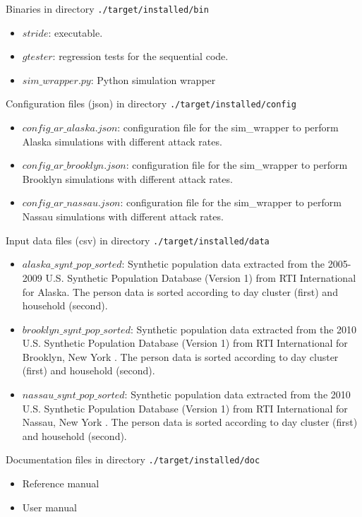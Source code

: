 \begin{compactitem}
    \item Binaries 
    		in directory \texttt{./target/installed/bin}
      	\begin{itemize}
        		\item $stride$: executable.
			\item $gtester$: regression tests for the sequential code.
        		\item $sim\_wrapper.py$: Python simulation wrapper  		
        \end{itemize}
    \item Configuration files (json)
      	in directory \texttt{./target/installed/config}
      	\begin{itemize}
        		\item $config\_ar\_alaska.json$: configuration file for the sim\_wrapper to perform Alaska simulations with different attack rates.
			\item $config\_ar\_brooklyn.json$: configuration file for the sim\_wrapper to perform Brooklyn simulations with different attack rates.
        		\item $config\_ar\_nassau.json$: configuration file for the sim\_wrapper to perform Nassau simulations with different attack rates.
        \end{itemize}
    \item Input data files (csv)
      	in directory \texttt{./target/installed/data}
      	\begin{itemize}
        		\item $alaska\_synt\_pop\_sorted$: Synthetic population data extracted from the 2005-2009 U.S. Synthetic Population Database (Version 1) from RTI International for Alaska. The person data is sorted according to day cluster (first) and household (second).
		 	\item $brooklyn\_synt\_pop\_sorted$: Synthetic population data extracted from the 2010 U.S. Synthetic Population Database (Version 1) from RTI International for Brooklyn, New York \cite{wheaton2014a,wheaton2014b}. The person data is sorted according to day cluster (first) and household (second).
       		\item $nassau\_synt\_pop\_sorted$: Synthetic population data extracted from the 2010 U.S. Synthetic Population Database (Version 1) from RTI International for Nassau, New York \cite{wheaton2014a,wheaton2014b}. The person data is sorted according to day cluster (first) and household (second).
        \end{itemize}
    \item Documentation files
      	in directory \texttt{./target/installed/doc}
      	\begin{itemize}
        		\item Reference manual
        		\item User manual
        \end{itemize}
\end{compactitem}


